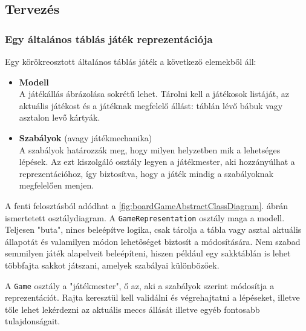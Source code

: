 \documentclass[twoside, a4paper, 12pt]{article}
\begin{document}
\subsection{Tervezés}
\subsubsection{Egy általános táblás játék reprezentációja}

Egy körökreosztott általános táblás játék a következő elemekből áll:

\begin{itemize}
	\item \textbf{Modell} \\
	A játékállás ábrázolása sokrétű lehet. Tárolni kell a játékosok listáját, az aktuális játékost és a játéknak megfelelő állást: táblán lévő bábuk vagy asztalon levő kártyák.
	
	\item \textbf{Szabályok} (avagy játékmechanika) \\
	A szabályok határozzák meg, hogy milyen helyzetben mik a lehetséges lépések. Az ezt kiszolgáló osztály legyen a játékmester, aki hozzányúlhat a reprezentációhoz, így biztosítva, hogy a játék mindig a szabályoknak megfelelően menjen.
\end{itemize}

A fenti felosztásból adódhat a \ref{fig:boardGameAbstractClassDiagram}. ábrán ismertetett osztálydiagram. A \texttt{GameRepresentation} osztály maga a modell. Teljesen "buta", nincs beleépítve logika, csak tárolja a tábla vagy asztal aktuális állapotát és valamilyen módon lehetőséget biztosít a módosítására. Nem szabad semmilyen játék alapelveit beleépíteni, hiszen például egy sakktáblán is lehet többfajta sakkot játszani, amelyek szabályai különbözőek.

A \texttt{Game} osztály a "játékmester", ő az, aki a szabályok szerint módosítja a reprezentációt. Rajta keresztül kell validálni és végrehajtatni a lépéseket, illetve tőle lehet lekérdezni az aktuális meccs állását illetve egyéb fontosabb tulajdonságait.
\end{document}
